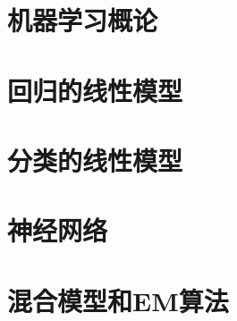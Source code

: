 \chapter{机器学习概论}





\chapter{回归的线性模型}






\chapter{分类的线性模型}





\chapter{神经网络}









\chapter{混合模型和EM算法}






